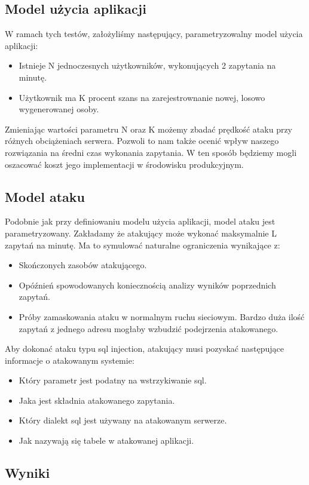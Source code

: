 \documentclass[conference]{IEEEtran}
\begin{document}
\subsection{Model użycia aplikacji}
W ramach tych testów, założyliśmy następujący, parametryzowalny model użycia aplikacji:
\begin{itemize}
    \item Istnieje N jednoczesnych użytkowników, wykonujących 2 zapytania na minutę.
    \item Użytkownik ma K procent szans na zarejestrownanie nowej, losowo wygenerowanej osoby.
\end{itemize}
Zmieniając wartości parametru N oraz K możemy zbadać prędkość ataku przy różnych obciążeniach serwera.
Pozwoli to nam także ocenić wpływ naszego rozwiązania na średni czas wykonania zapytania.
W ten sposób będziemy mogli oszacować koszt jego implementacji w środowisku produkcyjnym.
\subsection{Model ataku}
Podobnie jak przy definiowaniu modelu użycia aplikacji, model ataku jest parametryzowany.
Zakładamy że atakujący może wykonać maksymalnie L zapytań na minutę.
Ma to symulować naturalne ograniczenia wynikające z:
\begin{itemize}
    \item Skończonych zasobów atakującego.
    \item Opóźnień spowodowanych koniecznością analizy wyników poprzednich zapytań.
    \item Próby zamaskowania ataku w normalnym ruchu sieciowym. Bardzo duża ilość zapytań z jednego adresu mogłaby wzbudzić podejrzenia atakowanego.
\end{itemize}

Aby dokonać ataku typu sql injection, atakujący musi pozyskać następujące informacje o atakowanym systemie:
\begin{itemize}
    \item Który parametr jest podatny na wstrzykiwanie sql.
    \item Jaka jest składnia atakowanego zapytania.
    \item Który dialekt sql jest używany na atakowanym serwerze.
    \item Jak nazywają się tabele w atakowanej aplikacji.
\end{itemize}


\subsection{Wyniki}
\end{document}
